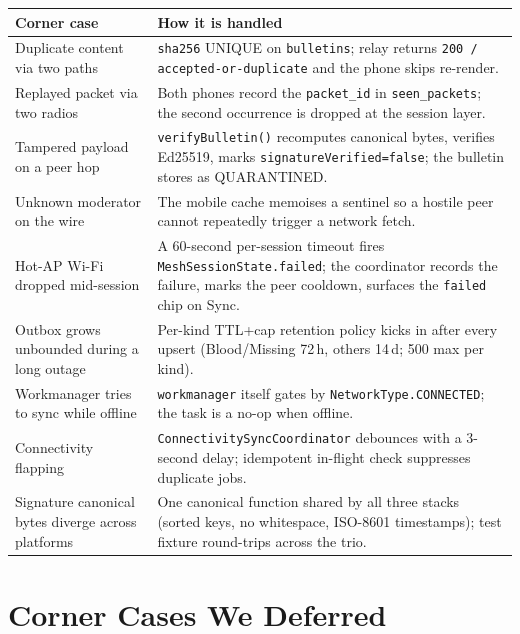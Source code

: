 \documentclass[11pt,a4paper]{article}
\begin{document}
\begin{longtable}{@{}p{34mm}p{68mm}@{}}
\toprule
\textbf{Corner case} & \textbf{How it is handled}\\
\midrule\endhead
Duplicate content via two paths &
\texttt{sha256} UNIQUE on \texttt{bulletins}; relay returns
\texttt{200 / accepted-or-duplicate} and the phone skips re-render.\\
\midrule
Replayed packet via two radios &
Both phones record the \texttt{packet\_id} in
\texttt{seen\_packets}; the second occurrence is dropped at the
session layer.\\
\midrule
Tampered payload on a peer hop &
\texttt{verifyBulletin()} recomputes canonical bytes, verifies
Ed25519, marks \texttt{signatureVerified=false}; the bulletin
stores as QUARANTINED.\\
\midrule
Unknown moderator on the wire &
The mobile cache memoises a sentinel so a hostile peer cannot
repeatedly trigger a network fetch.\\
\midrule
Hot-AP Wi-Fi dropped mid-session &
A 60-second per-session timeout fires
\texttt{MeshSessionState.failed}; the coordinator records the
failure, marks the peer cooldown, surfaces the \texttt{failed}
chip on Sync.\\
\midrule
Outbox grows unbounded during a long outage &
Per-kind TTL+cap retention policy kicks in after every upsert
(Blood/Missing 72\,h, others 14\,d; 500 max per kind).\\
\midrule
Workmanager tries to sync while offline &
\texttt{workmanager} itself gates by
\texttt{NetworkType.CONNECTED}; the task is a no-op when offline.\\
\midrule
Connectivity flapping &
\texttt{ConnectivitySyncCoordinator} debounces with a 3-second
delay; idempotent in-flight check suppresses duplicate jobs.\\
\midrule
Signature canonical bytes diverge across platforms &
One canonical function shared by all three stacks (sorted keys,
no whitespace, ISO-8601 timestamps); test fixture round-trips
across the trio.\\
\bottomrule
\end{longtable}

\section{Corner Cases We Deferred}
\label{sec:corner-deferred}
\end{document}
